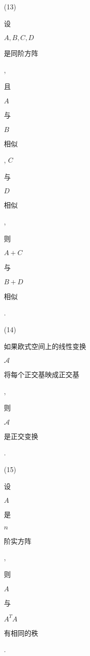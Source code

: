 \documentclass[10pt]{article}
\begin{document}
(13) \begin{CJK}{UTF8}{mj}设\end{CJK} $A, B, C, D$ \begin{CJK}{UTF8}{mj}是同阶方阵\end{CJK}, \begin{CJK}{UTF8}{mj}且\end{CJK} $A$ \begin{CJK}{UTF8}{mj}与\end{CJK} $B$ \begin{CJK}{UTF8}{mj}相似\end{CJK}, $C$ \begin{CJK}{UTF8}{mj}与\end{CJK} $D$ \begin{CJK}{UTF8}{mj}相似\end{CJK}, \begin{CJK}{UTF8}{mj}则\end{CJK} $A+C$ \begin{CJK}{UTF8}{mj}与\end{CJK} $B+D$ \begin{CJK}{UTF8}{mj}相似\end{CJK}.

(14) \begin{CJK}{UTF8}{mj}如果欧式空间上的线性变换\end{CJK} $\mathscr{A}$ \begin{CJK}{UTF8}{mj}将每个正交基映成正交基\end{CJK},\begin{CJK}{UTF8}{mj}则\end{CJK} $\mathscr{A}$ \begin{CJK}{UTF8}{mj}是正交变换\end{CJK}.

(15) \begin{CJK}{UTF8}{mj}设\end{CJK} $A$ \begin{CJK}{UTF8}{mj}是\end{CJK} $n$ \begin{CJK}{UTF8}{mj}阶实方阵\end{CJK}, \begin{CJK}{UTF8}{mj}则\end{CJK} $A$ \begin{CJK}{UTF8}{mj}与\end{CJK} $A^{T} A$ \begin{CJK}{UTF8}{mj}有相同的秩\end{CJK}.
\end{document}
